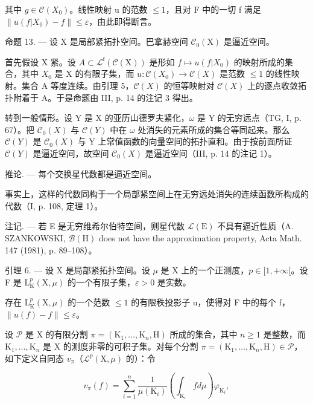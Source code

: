其中 \(g \in \mathcal{C}(X_{0})\)。线性映射 u 的范数 \(\leqslant 1\)，且对 F 中的一切 f 满足 \(\|u(f|X_{0}) - f\| \leqslant \varepsilon\)，由此即得断言。

命题 13. --- 设 X 是局部紧拓扑空间。巴拿赫空间 \(\mathcal{C}_{0}(\mathrm{X})\) 是逼近空间。

首先假设 X 紧。设 \(A \subset \mathcal{L}^{\mathrm{f}}(\mathcal{C}(\mathrm{X}))\) 是形如 \(f \mapsto u(f|X_{0})\) 的映射所成的集合，其中 \(X_{0}\) 是 X 的有限子集，而 \(u : \mathcal{C}(X_{0}) \to \mathcal{C}(X)\) 是范数 \(\leqslant 1\) 的线性映射。集合 A 等度连续。由引理 5，\(\mathcal{C}(X)\) 的恒等映射对 \(\mathcal{C}(X)\) 上的逐点收敛拓扑附着于 A。于是命题由 III, p. 14 的注记 3 得出。

转到一般情形。设 Y 是 X 的亚历山德罗夫紧化，\(\omega\) 是 Y 的无穷远点（TG, I, p. 67）。把 \(\mathcal{C}_{0}(X)\) 与 \(\mathcal{C}(Y)\) 中在 \(\omega\) 处消失的元素所成的集合等同起来。那么 \(\mathcal{C}(Y)\) 是 \(\mathcal{C}_{0}(X)\) 与 Y 上常值函数的向量空间的拓扑直和。由于按前面所证 \(\mathcal{C}(Y)\) 是逼近空间，故空间 \(\mathcal{C}_{0}(X)\) 是逼近空间（III, p. 14 的注记 1）。

推论. --- 每个交换星代数都是逼近空间。

事实上，这样的代数同构于一个局部紧空间上在无穷远处消失的连续函数所构成的代数（I, p. 108, 定理 1）。

注记. --- 若 E 是无穷维希尔伯特空间，则星代数 \(\mathcal{L}(\mathrm{E})\) 不具有逼近性质（A. SZANKOWSKI, \(\mathcal{B}(\mathrm{H})\) does not have the approximation property, Acta Math. 147 (1981), p. 89--108）。

引理 6. --- 设 X 是局部紧拓扑空间。设 \(\mu\) 是 X 上的一个正测度，\(p \in [1, +\infty[\)。设 F 是 \(\mathrm{L}_{\mathrm{K}}^{p}(\mathrm{X}, \mu)\) 的一个有限子集，\(\varepsilon > 0\) 是实数。

存在 \(\mathrm{L}_{\mathrm{K}}^{p}(\mathrm{X},\mu)\) 的一个范数 \(\leqslant 1\) 的有限秩投影子 u，使得对 F 中的每个 f，\(\|u(f)-f\|\leqslant\varepsilon\)。

设 \(\mathcal{P}\) 是 X 的有限分割 \(\pi = (\mathrm{K}_1, \ldots, \mathrm{K}_n, \mathrm{H})\) 所成的集合，其中 \(n \geqslant 1\) 是整数，而 \(\mathrm{K}_1, \ldots, \mathrm{K}_n\) 是 X 的测度非零的可积子集。对每个分割 \(\pi = (\mathrm{K}_1, \ldots, \mathrm{K}_n, \mathrm{H}) \in \mathcal{P}\)，如下定义自同态 \(v_\pi\)（\(\mathcal{L}^p(\mathrm{X}, \mu)\) 的）：令

\[
v _ {\pi} (f) = \sum_ {i = 1} ^ {n} \frac {1}{\mu (\mathrm{K} _ {i})} \left(\int_ {\mathrm{K} _ {i}} f d \mu\right) \varphi_ {\mathrm{K} _ {i}},
\]

